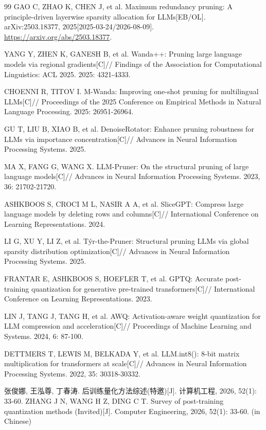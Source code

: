 \begin{thebibliography}{99}
GAO C, ZHAO K, CHEN J, et al.
Maximum redundancy pruning: A principle-driven layerwise sparsity allocation for LLMs[EB/OL].
arXiv:2503.18377, 2025[2025-03-24/2026-08-09].
\url{https://arxiv.org/abs/2503.18377}.

YANG Y, ZHEN K, GANESH B, et al.
Wanda++: Pruning large language models via regional gradients[C]//
Findings of the Association for Computational Linguistics: ACL 2025.
2025: 4321-4333.

CHOENNI R, TITOV I.
M-Wanda: Improving one-shot pruning for multilingual LLMs[C]//
Proceedings of the 2025 Conference on Empirical Methods in Natural Language Processing.
2025: 26951-26964.

GU T, LIU B, XIAO B, et al.
DenoiseRotator: Enhance pruning robustness for LLMs via importance concentration[C]//
Advances in Neural Information Processing Systems.
2025.

MA X, FANG G, WANG X.
LLM-Pruner: On the structural pruning of large language models[C]//
Advances in Neural Information Processing Systems.
2023, 36: 21702-21720.

ASHKBOOS S, CROCI M L, NASIR A A, et al.
SliceGPT: Compress large language models by deleting rows and columns[C]//
International Conference on Learning Representations.
2024.

LI G, XU Y, LI Z, et al.
T\'yr-the-Pruner: Structural pruning LLMs via global sparsity distribution optimization[C]//
Advances in Neural Information Processing Systems.
2025.

FRANTAR E, ASHKBOOS S, HOEFLER T, et al.
GPTQ: Accurate post-training quantization for generative pre-trained transformers[C]//
International Conference on Learning Representations.
2023.

LIN J, TANG J, TANG H, et al.
AWQ: Activation-aware weight quantization for LLM compression and acceleration[C]//
Proceedings of Machine Learning and Systems.
2024, 6: 87-100.

DETTMERS T, LEWIS M, BELKADA Y, et al.
LLM.int8(): 8-bit matrix multiplication for transformers at scale[C]//
Advances in Neural Information Processing Systems.
2022, 35: 30318-30332.

张俊娜, 王泓尊, 丁春涛.
后训练量化方法综述(特邀)[J].
计算机工程, 2026, 52(1): 33-60.
ZHANG J N, WANG H Z, DING C T. Survey of post-training quantization methods (Invited)[J].
Computer Engineering, 2026, 52(1): 33-60. (in Chinese)


\end{thebibliography}
